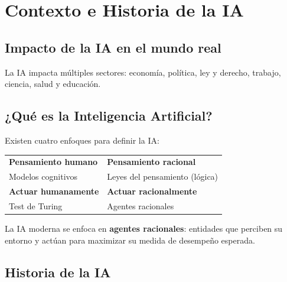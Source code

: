 \section{Contexto e Historia de la IA}

\subsection{Impacto de la IA en el mundo real}

La IA impacta múltiples sectores: economía, política, ley y derecho, trabajo, ciencia, salud y educación.

\subsection{¿Qué es la Inteligencia Artificial?}

Existen cuatro enfoques para definir la IA:

\begin{center}
\begin{tabular}{|l|l|}
\hline
\textbf{Pensamiento humano} & \textbf{Pensamiento racional} \\
Modelos cognitivos & Leyes del pensamiento (lógica) \\
\hline
\textbf{Actuar humanamente} & \textbf{Actuar racionalmente} \\
Test de Turing & Agentes racionales \\
\hline
\end{tabular}
\end{center}

\begin{remark}
La IA moderna se enfoca en \textbf{agentes racionales}: entidades que perciben su entorno y actúan para maximizar su medida de desempeño esperada.
\end{remark}

\subsection{Historia de la IA}

